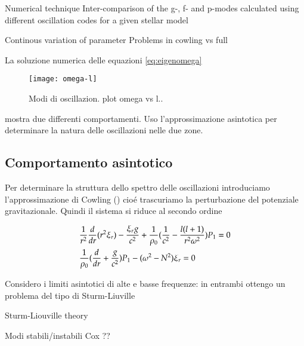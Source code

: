 \documentclass[oneside,12pt,fleqn]{memoir}
\begin{document}
\begin{todo}{Numerical technique}
Inter-comparison of the g-, f- and p-modes calculated using different oscillation codes for a given stellar model

\end{todo}

\begin{todo}{Continous variation of parameter}
Problems in cowling vs full
\end{todo}

La soluzione numerica delle equazioni \eqref{eq:eigenomega}



\begin{figure}[!ht]
\centering
\texttt{[image: omega-l]}
\caption{Modi di oscillazion. plot omega vs l..}
\end{figure}

mostra due differenti comportamenti. Uso l'approssimazione asintotica per determinare la natura delle oscillazioni nelle due zone.

\clearpage

\subsection{Comportamento asintotico}


Per determinare la struttura dello spettro delle oscillazioni introduciamo l'approssimazione di Cowling (\cite{cow41oscillations}) cio\'e trascuriamo la perturbazione del potenziale gravitazionale. Quindi il sistema si riduce al secondo ordine

\begin{align}
&\frac{1}{r^2}\frac{d}{d r}(r^2\xi_r)-\frac{\xi_rg}{c^2}+\frac{1}{\rho_0}(\frac{1}{c^2}-\frac{l(l+1)}{r^2\omega^2})P_1=0\label{eq:cowosc}\\
&\frac{1}{\rho_0}(\frac{d}{d r}+\frac{g}{c^2})P_1-(\omega^2-N^2)\xi_r=0\nonumber
\end{align}

Considero i limiti asintotici di alte e basse frequenze: in entrambi ottengo un problema del tipo di Sturm-Liuville

\begin{todo}{Sturm-Liouville theory}
\end{todo}

\begin{todo}{Modi stabili/instabili}
Cox ??
\end{todo}
\end{document}
